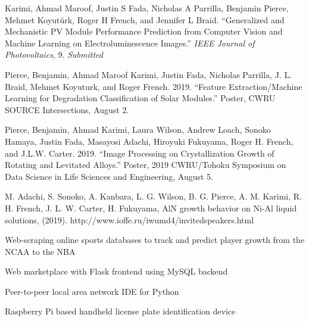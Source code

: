 \documentclass[10pt]{article}
\begin{document}
	{\begin{newitemize}
		\item{Karimi, Ahmad Maroof, Justin S Fada, Nicholas A Parrilla, { Benjamin Pierce}, Mehmet Koyutürk, Roger H French, and Jennifer L Braid. “Generalized and Mechanistic PV Module Performance Prediction from Computer Vision and Machine Learning on Electroluminescence Images.” \textit{IEEE Journal of Photovoltaics}, 9.} \textit{Submitted}
		\item{{ Pierce, Benjamin}, Ahmad Maroof Karimi, Justin Fada, Nicholas Parrilla, J. L. Braid, Mehmet Koyuturk, and Roger French. 2019. “Feature Extraction/Machine Learning for Degradation Classification of Solar Modules.” Poster, CWRU SOURCE Intersections, August 2.}
		\item{{ Pierce, Benjamin}, Ahmad Karimi, Laura Wilson, Andrew Loach, Sonoko Hamaya, Justin Fada, Masayosi Adachi, Hiroyuki Fukuyama, Roger H. French, and J.L.W. Carter. 2019. “Image Processing on Crystallization Growth of Rotating and Levitated Alloys.” Poster, 2019 CWRU/Tohoku Symposium on Data Science in Life Sciences and Engineering, August 5.}
		\item{M. Adachi, S. Sonoko, A. Kanbara, L. G. Wilson, {B. G. Pierce}, A. M. Karimi, R. H. French, J. L. W. Carter, H. Fukuyama, AlN growth behavior on Ni-Al liquid solutions, (2019). http://www.ioffe.ru/iwumd4/invitedspeakers.html}
	\end{newitemize}}
	
	{\begin{newitemize}
		\item{Web-scraping online sports databases to track and predict player growth from the NCAA to the NBA}
		\item{Web marketplace with Flask frontend using MySQL backend}
		\item{Peer-to-peer local area network IDE for Python}
		\item{Raspberry Pi based handheld license plate identification device}
		  
	\end{newitemize}}
\end{document}
